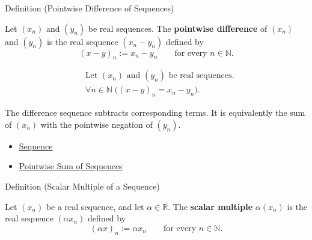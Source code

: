 
\begin{definitionbox}{Definition (Pointwise Difference of Sequences)}
\begin{definition}
\label{def:pointwise-difference-sequence}
Let $(x_n)$ and $(y_n)$ be real sequences. The \textbf{pointwise difference}
of $(x_n)$ and $(y_n)$ is the real sequence $(x_n-y_n)$ defined by
\[
(x-y)_n := x_n-y_n
\qquad
\text{for every } n\in\mathbb{N}.
\]
\end{definition}
\end{definitionbox}

\begin{remark*}
\[
\begin{aligned}
&\text{Let } (x_n) \text{ and } (y_n) \text{ be real sequences.}\\
&\forall n\in\mathbb{N}\;\bigl((x-y)_n=x_n-y_n\bigr).
\end{aligned}
\]
\end{remark*}

\begin{remark*}[Interpretation]
The difference sequence subtracts corresponding terms. It is equivalently the
sum of $(x_n)$ with the pointwise negation of $(y_n)$.
\end{remark*}

\begin{dependencies}
\begin{itemize}
  \item \hyperref[def:sequence]{Sequence}
  \item \hyperref[def:pointwise-sum-sequence]{Pointwise Sum of Sequences}
\end{itemize}
\end{dependencies}


\begin{definitionbox}{Definition (Scalar Multiple of a Sequence)}
\begin{definition}
\label{def:scalar-multiple-sequence}
Let $(x_n)$ be a real sequence, and let $\alpha\in\mathbb{R}$. The
\textbf{scalar multiple} $\alpha(x_n)$ is the real sequence
$(\alpha x_n)$ defined by
\[
(\alpha x)_n := \alpha x_n
\qquad
\text{for every } n\in\mathbb{N}.
\]
\end{definition}
\end{definitionbox}

